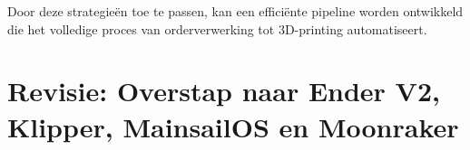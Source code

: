 Door deze strategieën toe te passen, kan een efficiënte pipeline worden ontwikkeld die het volledige proces van orderverwerking tot 3D-printing automatiseert.







































    
\section{Revisie: Overstap naar Ender V2, Klipper, MainsailOS en Moonraker}
\label{ch:revisie}

